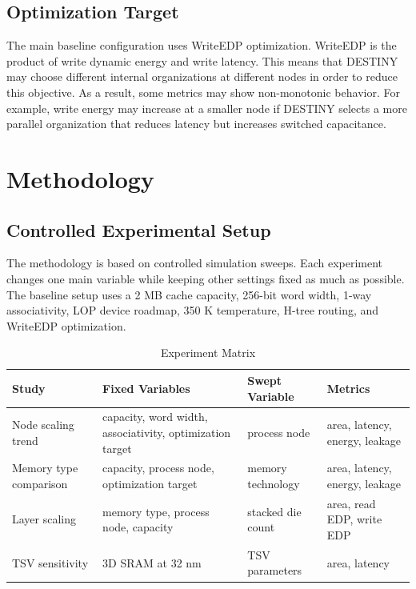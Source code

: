 \documentclass[conference]{IEEEtran}
\begin{document}
\subsection{Optimization Target}

The main baseline configuration uses WriteEDP optimization. WriteEDP is the product of write dynamic energy and write latency. This means that DESTINY may choose different internal organizations at different nodes in order to reduce this objective. As a result, some metrics may show non-monotonic behavior. For example, write energy may increase at a smaller node if DESTINY selects a more parallel organization that reduces latency but increases switched capacitance.

\section{Methodology}

\subsection{Controlled Experimental Setup}

The methodology is based on controlled simulation sweeps. Each experiment changes one main variable while keeping other settings fixed as much as possible. The baseline setup uses a 2 MB cache capacity, 256-bit word width, 1-way associativity, LOP device roadmap, 350 K temperature, H-tree routing, and WriteEDP optimization.


\begin{table}[t]
\caption{Experiment Matrix}
\label{tab:experiment-matrix}
\centering
\renewcommand{\arraystretch}{1.15}
\setlength{\tabcolsep}{5pt}
\begin{tabularx}{\textwidth}{@{}
>{\RaggedRight\arraybackslash}p{}
>{\RaggedRight\arraybackslash}X
>{\RaggedRight\arraybackslash}p{}
>{\RaggedRight\arraybackslash}p{}
@{}}
\toprule
\textbf{Study} & \textbf{Fixed Variables} & \textbf{Swept Variable} & \textbf{Metrics} \\
\midrule
Node scaling trend &
capacity, word width, associativity, optimization target &
process node &
area, latency, energy, leakage \\
\midrule
Memory type comparison &
capacity, process node, optimization target &
memory technology &
area, latency, energy, leakage \\
\midrule
Layer scaling &
memory type, process node, capacity &
stacked die count &
area, read EDP, write EDP \\
\midrule
TSV sensitivity &
3D SRAM at 32 nm &
TSV parameters &
area, latency \\
\bottomrule
\end{tabularx}
\end{table}
\end{document}
